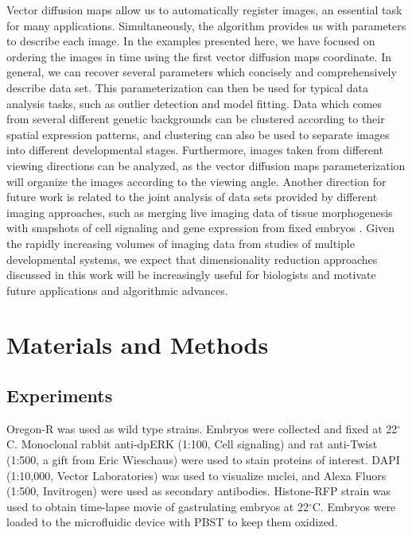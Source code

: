 \documentclass[twocolumn, 10pt]{article}
\begin{document}
Vector diffusion maps allow us to automatically register images, an essential task for many applications.
%
Simultaneously, the algorithm provides us with parameters to describe each image.
%
In the examples presented here, we have focused on ordering the images in time using the first vector diffusion maps coordinate.
%
In general, we can recover several parameters which concisely and comprehensively describe data set.
%
This parameterization can then be used for typical data analysis tasks, such as outlier detection and model fitting.
%
Data which comes from several different genetic backgrounds can be clustered according to their spatial expression patterns, and clustering can also be used to separate images into different developmental stages. 
%
Furthermore, images taken from different viewing directions can be analyzed, as the vector diffusion maps parameterization will organize the images according to the viewing angle.
%
Another direction for future work is related to the joint analysis of data sets provided by different imaging approaches, such as merging live imaging data of tissue morphogenesis with snapshots of cell signaling and gene expression from fixed embryos \citep{krzic2012multiview, ichikawa2014live, rubel2010coupling}.  
%
Given the rapidly increasing volumes of imaging data from studies of multiple developmental systems, we expect that dimensionality reduction approaches discussed in this work will be increasingly useful for biologists and motivate future applications and algorithmic advances. 
  





\section*{Materials and Methods}

\subsection*{Experiments}
%
Oregon-R was used as wild type strains. 
%
Embryos were collected and fixed at 22$^\circ$C. 
%
Monoclonal rabbit anti-dpERK (1:100, Cell signaling) and rat anti-Twist (1:500, a gift from Eric Wieschaus) were used to stain proteins of interest. 
%
DAPI (1:10,000, Vector Laboratories) was used to visualize nuclei, and Alexa Fluors (1:500, Invitrogen) were used as secondary antibodies. 
%
Histone-RFP strain was used to obtain time-lapse movie of gastrulating embryos at 22$^\circ$C. 
%
Embryos were loaded to the microfluidic device with PBST to keep them oxidized. 
\end{document}
